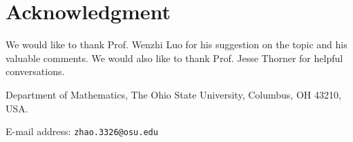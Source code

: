 \documentclass[12pt]{amsart}
\begin{document}
\section*{Acknowledgment}
We would like to thank Prof. Wenzhi Luo for his suggestion on the topic and his valuable comments. We would also like to thank Prof. Jesse Thorner for helpful conversations.

	


\vspace{3mm}

\noindent Department of Mathematics, The Ohio State University, Columbus, OH 43210, USA.

\noindent E-mail address: {\tt zhao.3326@osu.edu}
\end{document}
